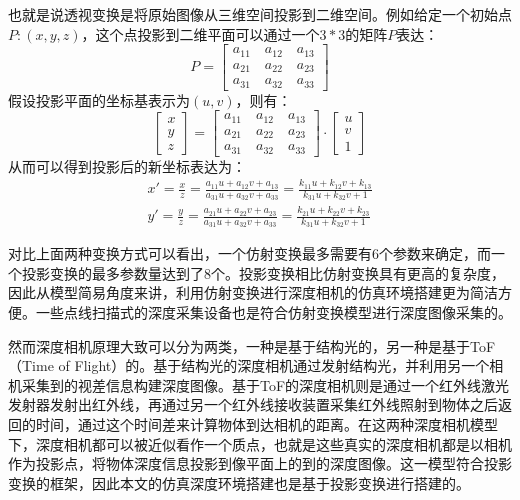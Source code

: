 也就是说透视变换是将原始图像从三维空间投影到二维空间。例如给定一个初始点$P:(x,y,z)$，这个点投影到二维平面可以通过一个$3*3$的矩阵$P$表达：
\begin{equation}
	P=
	\left[
	\begin{aligned}
	a_{11}\quad a_{12}\quad a_{13} \\
	a_{21}\quad a_{22}\quad a_{23} \\
	a_{31}\quad a_{32}\quad a_{33}
	\end{aligned}
	\right]
\end{equation}
假设投影平面的坐标基表示为$(u,v)$，则有：
\begin{equation}
	\left[
	\begin{aligned}
	x \\
	y \\
	z
	\end{aligned}
	\right]=
	\left[
	\begin{aligned}
	a_{11}\quad a_{12}\quad a_{13} \\
	a_{21}\quad a_{22}\quad a_{23} \\
	a_{31}\quad a_{32}\quad a_{33}
	\end{aligned}
	\right]\cdot
	\left[
	\begin{aligned}
	u \\
	v \\
	1
	\end{aligned}
	\right]
\end{equation}
从而可以得到投影后的新坐标表达为：
\begin{equation}
\begin{aligned}
	x'=\frac{x}{z}=\frac{a_{11}u+a_{12}v+a_{13}}{a_{31}u+a_{32}v+a_{33}}
		=\frac{k_{11}u+k_{12}v+k_{13}}{k_{31}u+k_{32}v+1} \\
	y'=\frac{y}{z}=\frac{a_{21}u+a_{22}v+a_{23}}{a_{31}u+a_{32}v+a_{33}}
		=\frac{k_{21}u+k_{22}v+k_{23}}{k_{31}u+k_{32}v+1}
\end{aligned}
\end{equation}

对比上面两种变换方式可以看出，一个仿射变换最多需要有6个参数来确定，而一个投影变换的最多参数量达到了8个。投影变换相比仿射变换具有更高的复杂度，因此从模型简易角度来讲，利用仿射变换进行深度相机的仿真环境搭建更为简洁方便。一些点线扫描式的深度采集设备也是符合仿射变换模型进行深度图像采集的。

然而深度相机原理大致可以分为两类，一种是基于结构光的，另一种是基于ToF（Time of Flight）的。基于结构光的深度相机通过发射结构光，并利用另一个相机采集到的视差信息构建深度图像。基于ToF的深度相机则是通过一个红外线激光发射器发射出红外线，再通过另一个红外线接收装置采集红外线照射到物体之后返回的时间，通过这个时间差来计算物体到达相机的距离。在这两种深度相机模型下，深度相机都可以被近似看作一个质点，也就是这些真实的深度相机都是以相机作为投影点，将物体深度信息投影到像平面上的到的深度图像。这一模型符合投影变换的框架，因此本文的仿真深度环境搭建也是基于投影变换进行搭建的。

